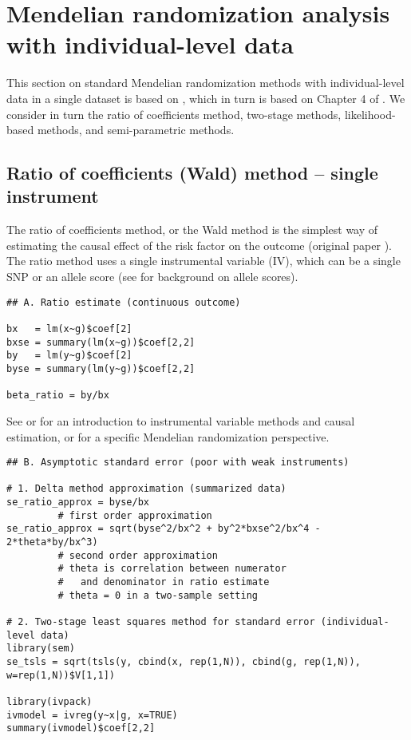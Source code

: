 \documentclass[a4paper,12pt]{article} %
\begin{document}
\clearpage

\section{Mendelian randomization analysis with individual-level data}
This section on standard Mendelian randomization methods with individual-level data in a single dataset is based on \cite{burgess2015review}, which in turn is based on Chapter 4 of \cite{burgess2015book}. We consider in turn the ratio of coefficients method, two-stage methods, likelihood-based methods, and semi-parametric methods.

\clearpage

\subsection{Ratio of coefficients (Wald) method -- single instrument}
The ratio of coefficients method, or the Wald method is the simplest way of estimating the causal effect of the risk factor on the outcome (original paper \citep{wald1940}). The ratio method uses a single instrumental variable (IV), which can be a single SNP or an allele score (see \cite{burgess2012score} for background on allele scores).

\begin{lstlisting}
## A. Ratio estimate (continuous outcome)

bx   = lm(x~g)$coef[2]
bxse = summary(lm(x~g))$coef[2,2]
by   = lm(y~g)$coef[2]
byse = summary(lm(y~g))$coef[2,2]

beta_ratio = by/bx
\end{lstlisting}

See \cite{greenland2000} or \cite{martens2006} for an introduction to instrumental variable methods and causal estimation, or \cite{lawlor2007} for a specific Mendelian randomization perspective.

\begin{lstlisting}
## B. Asymptotic standard error (poor with weak instruments)

# 1. Delta method approximation (summarized data)
se_ratio_approx = byse/bx
         # first order approximation
se_ratio_approx = sqrt(byse^2/bx^2 + by^2*bxse^2/bx^4 - 2*theta*by/bx^3)
         # second order approximation
         # theta is correlation between numerator
         #   and denominator in ratio estimate
         # theta = 0 in a two-sample setting

# 2. Two-stage least squares method for standard error (individual-level data)
library(sem)
se_tsls = sqrt(tsls(y, cbind(x, rep(1,N)), cbind(g, rep(1,N)), w=rep(1,N))$V[1,1])

library(ivpack)
ivmodel = ivreg(y~x|g, x=TRUE)
summary(ivmodel)$coef[2,2]
\end{lstlisting}
\end{document}
